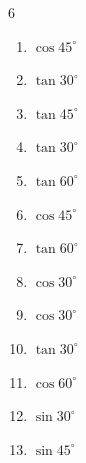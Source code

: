 \begin{multicols}{6}
\begin{enumerate}
  \item $\displaystyle \cos{45^\circ}$


  \item $\displaystyle \tan{30^\circ}$


\columnbreak %

  \item $\displaystyle \tan{45^\circ}$

        \phantom{$\displaystyle =1$}

  \item $\displaystyle \tan{30^\circ}$


  \item $\displaystyle \tan{60^\circ}$


  \item $\displaystyle \cos{45^\circ}$


  \item $\displaystyle \tan{60^\circ}$


  \item $\displaystyle \cos{30^\circ}$


  \item $\displaystyle \cos{30^\circ}$


  \item $\displaystyle \tan{30^\circ}$


  \item $\displaystyle \cos{60^\circ}$


  \item $\displaystyle \sin{30^\circ}$


  \item $\displaystyle \sin{45^\circ}$


\end{enumerate}
\end{multicols}
